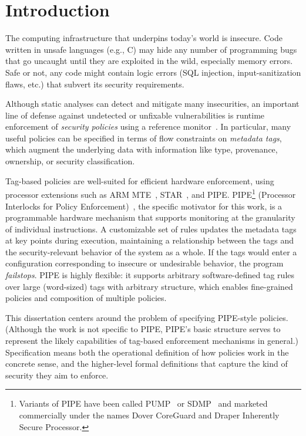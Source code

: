 \documentclass{report}
\begin{document}
\chapter{Introduction}

The computing infrastructure that underpins today's world is insecure. Code written
in unsafe languages (e.g., C) may hide any number of programming bugs that go uncaught
until they are exploited in the wild, especially memory errors. Safe or not, any code
might contain logic errors (SQL injection, input-sanitization flaws, etc.) that subvert
its security requirements.

Although static analyses can detect and mitigate many insecurities, an important line of
defense against undetected or unfixable vulnerabilities is runtime enforcement of
{\em security policies} using a reference monitor~\cite{Anderson72:PlanningStudy}. In particular, 
many useful policies can be specified in terms of flow constraints on 
\emph{metadata tags}, which augment the underlying data with information like type, provenance,
ownership, or security classification.

Tag-based policies are well-suited for efficient hardware enforcement, using 
processor extensions such as ARM MTE~\cite{arm-mte},
STAR~\cite{Gollapudi:23}, and
PIPE.  PIPE\footnote{ Variants of PIPE have
been called PUMP~\cite{Dhawan+15} or %
SDMP~\cite{RoesslerD18}%
and marketed commercially under the names Dover CoreGuard and Draper Inherently Secure Processor.}
(Processor Interlocks for Policy Enforcement)~\cite{Azevedo+16,Azevedo+15},%
the specific motivator for this work, is a programmable hardware mechanism that supports monitoring 
at the granularity of individual instructions. A customizable set of rules updates the metadata tags
at key points during execution, maintaining a relationship between the tags and the security-relevant
behavior of the system as a whole. If the tags would enter a configuration corresponding to insecure
or undesirable behavior, the program \emph{failstops}. PIPE is highly flexible: it supports
arbitrary software-defined tag rules over large (word-sized) tags with arbitrary structure,
which enables fine-grained policies and composition of multiple policies.

This dissertation centers around the problem of specifying PIPE-style policies.
(Although the work is not specific to PIPE, PIPE's basic structure serves to represent the
likely capabilities of tag-based enforcement mechanisms in general.) Specification
means both the operational definition of how policies work in the concrete sense, and
the higher-level formal definitions that capture the kind of security they aim to enforce.
\end{document}
